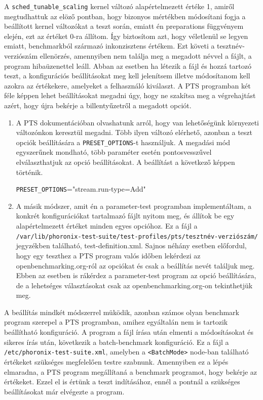 A \texttt{sched\_tunable\_scaling} kernel változó alapértelmezett értéke 1, amiről megtudhattuk az elöző pontban, hogy bizonyos mértékben módosítani fogja a beállított kernel változókat a teszt során, emiatt én preparations függvényem elején, ezt az értéket 0-ra állítom. Így biztosítom azt, hogy véletlenül se legyen emiatt, benchmarkból származó inkonzisztens értékem.
Ezt követi a tesztnév-verziószám ellenörzés, amennyiben nem találja meg a megadott névvel a fájlt, a program hibaüzenettel leáll.
Abban az esetben ha létezik a fájl és hozzá tartozó teszt, a konfigurációs beállításokat meg kell jelenítsem illetve módosítanom kell azokra az értékekere, amelyeket a felhasználó kiválaszt.
A PTS programban két féle képpen lehet beállításokat megadni úgy, hogy ne szakítsa meg a végrehajtást azért, hogy újra bekérje a billentyűzetről a megadott opciót.
\begin{enumerate}
\item A PTS dokumentációban olvashatunk arról, hogy van lehetőségünk környezeti változónkon keresztül megadni. Több ilyen változó elérhető, azonban a teszt opciók beállítására a \texttt{PRESET\_OPTIONS}-t használjuk. A megadási mód egyszerűnek mondható, több paraméter esetén pontosvesszűvel elválaszthatjuk az opció beállításokat. A beállítást a következő képpen történik.

\texttt{PRESET\_OPTIONS}="stream.run-type=Add"
\item A másik módszer, amit én a parameter-test programban implementáltam, a konkrét konfigurációkat tartalmazó fájlt nyitom meg, és állítok be egy alapértelmezett értéket minden egyes opcióhoz. Ez a fájl a \texttt{/var/lib/phoronix-test}-\texttt{suite/test-profiles/pts/tesztnév-verziószám/} jegyzékben található, test-definition.xml. Sajnos néhány esetben előfordul, hogy egy teszthez a PTS program valós időben lekérdezi az openbenchmarking.org-ról az opciókat és csak a beállítás nevét találjuk meg. Ebben az esetben is rákérdez a parameter-test program az opció beállítására, de a lehetséges választásokat csak az openbenchmarking.org-on tekinthetjük meg. 
\end{enumerate}
A beállítás mindkét módszerrel müködik, azonban számos olyan benchmark program szerepel a PTS programban, amihez egyáltalán nem is tartozik beállítható konfiguráció. A program a fájl írása után elmenti a módosításokat és sikeres írás után, következik a batch-benchmark konfiguráció. 
Ez a fájl a \texttt{/etc/phoronix-test-suite.xml}, amelyben a \texttt{<BatchMode>} node-ban található értékeket szükséges megfelelően testre szabnunk. Amennyiben ez a lépés elmaradna, a PTS program megállítaná a benchmark programot, hogy bekérje az értékeket. Ezzel el is értünk a teszt indításához, ennél a pontnál a szükséges beállításokat már elvégezte a program.
